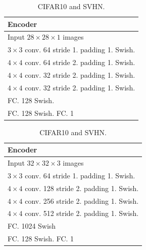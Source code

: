 \begin{table}[!h]
\caption{Architecture of IGEBM}
    \centering
    \vspace*{1ex}
    \begin{subtable}[h]{.5\textwidth}
    \caption{MNIST and Fashion-MNIST.}
    \centering
        \begin{tabular}{|l|}
        \toprule
        \textbf{Encoder} \\
        \midrule
        Input $28\times28\times1$ images  \\
        \hline 
        $3\times3$ conv. 64  stride 1. padding 1. Swish.  \\
        \hline 
        $4\times4$ conv. 64  stride 2. padding 1. Swish. \\
        \hline 
        $4\times4$ conv. 32  stride 2. padding 1. Swish.  \\
        \hline
        $4\times4$ conv. 32  stride 2. padding 1. Swish. \\
        \hline
        FC. 128 Swish. \\
        \hline
        FC. 128 Swish. FC. 1 \\
        \bottomrule
        \end{tabular}
    \end{subtable}%
    \begin{subtable}[h]{.5\textwidth}
    \caption{CIFAR10 and SVHN.}
    \centering
        \begin{tabular}{|l|}
        \toprule
        \textbf{Encoder}  \\
        \midrule
        Input $32\times32\times3$ images  \\
        \hline 
        $3\times3$ conv. 64 \hspace{0.2em} stride 1. padding 1. Swish.  \\
        \hline 
        $4\times4$ conv. 128  stride 2. padding 1. Swish. \\
        \hline 
        $4\times4$ conv. 256 stride 2. padding 1. Swish.  \\
        \hline
        $4\times4$ conv. 512  stride 2. padding 1. Swish. \\
        \hline
        FC. 1024 Swish \\
        \hline
        FC. 128 Swish. FC. 1\\
        \bottomrule
        \end{tabular}
    \vspace*{1ex}
    \end{subtable}
    \label{app:tab:arch-igebm}
\end{table}




